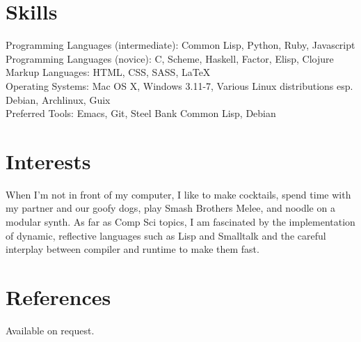 \documentclass[margintitle,line]{res}
\begin{document}
\begin{resume}
\section{Skills}

Programming Languages (intermediate): Common Lisp, Python, Ruby, Javascript \\
Programming Languages (novice): C, Scheme, Haskell, Factor, Elisp, Clojure \\
Markup Languages: HTML, CSS, SASS, LaTeX \\
Operating Systems: Mac OS X, Windows 3.11-7, Various Linux distributions
esp. Debian, Archlinux, Guix \\
Preferred Tools: Emacs, Git, Steel Bank Common Lisp, Debian \\


\section{Interests}

When I'm not in front of my computer, I like to make cocktails, spend
time with my partner and our goofy dogs, play Smash Brothers Melee,
and noodle on a modular synth. As far as Comp Sci topics, I am fascinated
by the implementation of dynamic, reflective languages such as Lisp and Smalltalk
and the careful interplay between compiler and runtime to make them fast.


\section{References}

Available on request.

\end{resume}
\end{document}
